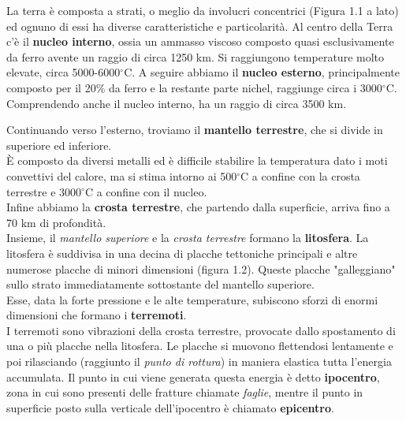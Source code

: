 \documentclass[a4paper,10pt]{memoir}
\begin{document}
La terra è composta a strati, o meglio da involucri concentrici (Figura 1.1 a lato) ed ognuno di essi ha diverse caratteristiche e particolarità.
Al centro della Terra c'è il \textbf{nucleo interno}, ossia un ammasso viscoso composto quasi esclusivamente da ferro avente un raggio di circa 1250 km. Si raggiungono temperature molto elevate, circa 5000-6000$^{\circ}$C.
A seguire abbiamo il \textbf{nucleo esterno}, principalmente composto per il 20\% da ferro e la restante parte nichel, raggiunge circa i 3000$^{\circ}$C. Comprendendo anche il nucleo interno, ha un raggio di circa 3500 km.

Continuando verso l'esterno, troviamo il \textbf{mantello terrestre}, che si divide in superiore ed inferiore.
\\
È composto da diversi metalli ed è difficile stabilire la temperatura dato i moti convettivi del calore, ma si stima intorno ai 500$^{\circ}$C a confine con la crosta terrestre e 3000$^{\circ}$C a confine con il nucleo.
\\
Infine abbiamo la \textbf{crosta terrestre}, che partendo dalla superficie, arriva fino a 70 km di profondità.
\\
Insieme, il \textit{mantello superiore} e la \textit{crosta terrestre} formano la \textbf{litosfera}.
La litosfera è suddivisa in una decina di placche tettoniche principali e altre numerose placche di minori dimensioni (figura 1.2). Queste placche "galleggiano" sullo strato immediatamente sottostante del mantello superiore.
\\
Esse, data la forte pressione e le alte temperature, subiscono sforzi di enormi dimensioni che formano i \textbf{terremoti}.
\\
I terremoti sono vibrazioni della crosta terrestre, provocate dallo spostamento  di una o più placche nella litosfera.
Le placche si muovono flettendosi lentamente e poi rilasciando (raggiunto il \textit{punto di rottura}) in maniera elastica tutta l'energia accumulata.
Il punto in cui viene generata questa energia è detto \textbf{ipocentro}, zona in cui sono presenti delle fratture chiamate \textit{faglie}, mentre il punto in superficie posto sulla verticale dell'ipocentro è chiamato \textbf{epicentro}.
\clearpage
\end{document}
